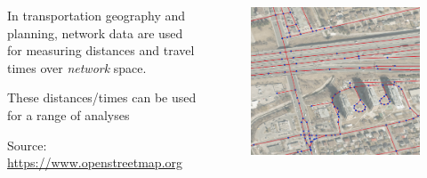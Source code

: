 \documentclass[aspectratio=169]{beamer}
\begin{document}
\begin{frame}

	
	\begin{columns}
		\begin{column}{0.5\textwidth}
			In transportation geography and planning, network data are used for measuring distances and travel times over \textit{network} space.
			\vspace{2mm}
			
			These distances/times can be used for a range of analyses
			
			\vspace{4mm}
			
			\tiny Source: \url{https://www.openstreetmap.org}
		\end{column}
		\begin{column}{0.5\textwidth}
			
			\begin{figure}
				\centering
				\includegraphics[width=1\linewidth]{images/network_tor_eg}
			\end{figure}
			
		\end{column}
	\end{columns}
	
	
\end{frame}
\end{document}
